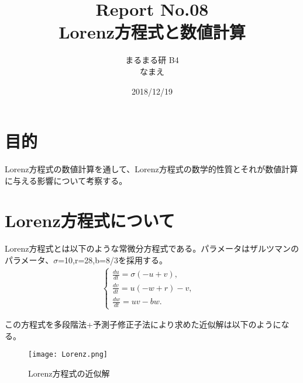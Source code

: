 \documentclass[12pt]{ltjsarticle}
\begin{document}
\begin{titlepage}
\title{Report No.08　\\ Lorenz方程式と数値計算}
\author{まるまる研 B4 \\ なまえ}
\date{2018/12/19}
\maketitle

\end{titlepage}

\section{目的}
Lorenz方程式の数値計算を通して、Lorenz方程式の数学的性質とそれが数値計算に与える影響について考察する。

\section{Lorenz方程式について}
Lorenz方程式とは以下のような常微分方程式である。パラメータはザルツマンのパラメータ、$\sigma$=10,r=28,b=8/3を採用する。
\begin{eqnarray}
    \begin{cases}
        \frac{du}{dt} = \sigma(-u+v), & \\
        \frac{dv}{dt} = u(-w+r)-v, & \\
        \frac{dw}{dt} = uv-bw. &
    \end{cases}
    \label{newton}
\end{eqnarray}

この方程式を多段階法+予測子修正子法により求めた近似解は以下のようになる。
\begin{figure}[htbp]
    \begin{center}
    \texttt{[image: Lorenz.png]}
    \caption{Lorenz方程式の近似解}
        \end{center}
\end{figure}
\end{document}
